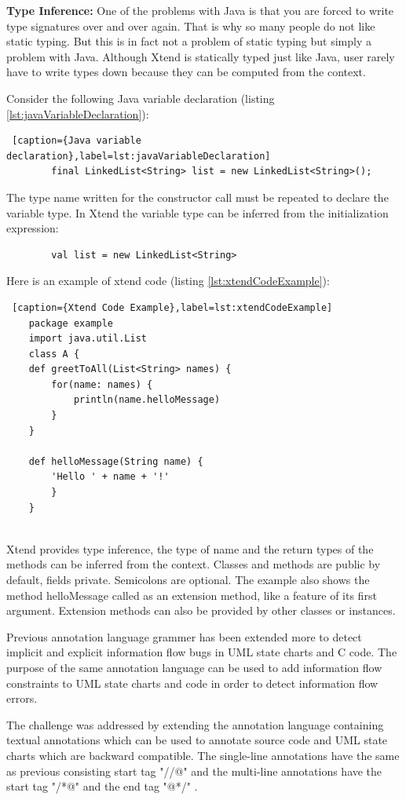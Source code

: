 \begin{itemize}
	\textbf{Type Inference:}
	One of the problems with Java is that you are forced to write type signatures over and over again. That is why so many people do not like static typing. But this is in fact not a problem of static typing but simply a problem with Java. Although Xtend is statically typed just like Java, user rarely have to write types down because they can be computed from the context.
	
	Consider the following Java variable declaration (listing \ref{lst:javaVariableDeclaration}):
	\begin{lstlisting} [caption={Java variable declaration},label=lst:javaVariableDeclaration]
		final LinkedList<String> list = new LinkedList<String>();
	\end{lstlisting}
	The type name written for the constructor call must be repeated to declare the variable type. In Xtend the variable type can be inferred from the initialization expression:
	\begin{lstlisting}
		val list = new LinkedList<String>
	\end{lstlisting}
		
	Here is an example of xtend code (listing \ref{lst:xtendCodeExample}):
	\begin{lstlisting} [caption={Xtend Code Example},label=lst:xtendCodeExample]
	package example	
	import java.util.List		
	class A {
	def greetToAll(List<String> names) {
		for(name: names) {
			println(name.helloMessage)
		}
	}
		
	def helloMessage(String name) {
		'Hello ' + name + '!'
		}
	}
	
	\end{lstlisting} 
	   
Xtend provides type inference, the type of name and the return types of the methods can be inferred from the context. Classes and methods are public by default, fields private. Semicolons are optional. The example also shows the method helloMessage called as an extension method, like a feature of its first argument. Extension methods can also be provided by other classes or instances.
\end{itemize}
Previous annotation language grammer has been extended more
to detect implicit and explicit information flow bugs in UML
state charts and C code. The purpose of the same annotation language
can be used to add information flow constraints to UML state
charts and code in order to detect information flow errors.

The challenge was addressed by extending the annotation language containing textual annotations which can be used to annotate source code and UML state charts which are backward compatible. The single-line annotations have the same as previous consisting start tag "//@" and the multi-line annotations have the start tag "/*@" and the end tag "@*/" .

